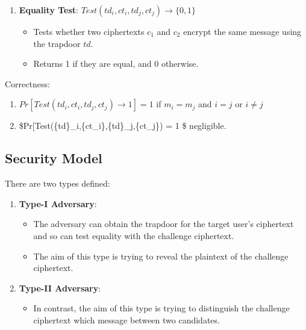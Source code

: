\documentclass[
]{article}
\providecommand{\tightlist}{%
  \setlength{\itemsep}{0pt}\setlength{\parskip}{0pt}}
\begin{document}
\begin{enumerate}
  \begin{itemize}
  \tightlist
  \item
    Generates a trapdoor \(td\) using the secret key \(sk\).
  \end{itemize}
\item
  \textbf{Equality Test}:
  \(Test(td_i, ct_i, td_j, ct_j) \rightarrow \{0, 1\}\)

  \begin{itemize}
  \tightlist
  \item
    Tests whether two ciphertexts \(c_1\) and \(c_2\) encrypt the same
    message using the trapdoor \(td\).
  \item
    Returns 1 if they are equal, and 0 otherwise.
  \end{itemize}
\end{enumerate}

Correctness:

\begin{enumerate}
\def\labelenumi{\arabic{enumi}.}
\item
  \(Pr[Test({td}_i,{ct_i},{td}_j,{ct_j}) \rightarrow 1] = 1\) if
  \(m_i = m_j\) and \(i = j\) or \(i \neq j\)
\item
  \$Pr{[}Test(\{td\}\_i,\{ct\_i\},\{td\}\_j,\{ct\_j\}) \rightarrow 1{]}
  = 1 \$ negligible.
\end{enumerate}

\hypertarget{security-model}{%
\subsection{Security Model}\label{security-model}}

There are two types defined:

\begin{enumerate}
\def\labelenumi{\arabic{enumi}.}
\tightlist
\item
  \textbf{Type-I Adversary}:

  \begin{itemize}
  \tightlist
  \item
    The adversary can obtain the trapdoor for the target user's
    ciphertext and so can test equality with the challenge ciphertext.
  \item
    The aim of this type is trying to reveal the plaintext of the
    challenge ciphertext.
  \end{itemize}
\item
  \textbf{Type-II Adversary}:

  \begin{itemize}
  \tightlist
  \item
    In contrast, the aim of this type is trying to distinguish the
    challenge ciphertext which message between two candidates.
  \end{itemize}
\end{enumerate}
\end{document}
